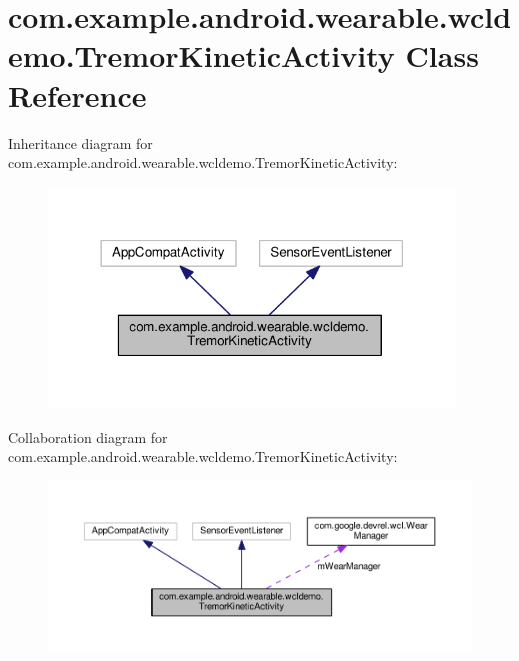 \hypertarget{classcom_1_1example_1_1android_1_1wearable_1_1wcldemo_1_1TremorKineticActivity}{}\section{com.\+example.\+android.\+wearable.\+wcldemo.\+Tremor\+Kinetic\+Activity Class Reference}
\label{classcom_1_1example_1_1android_1_1wearable_1_1wcldemo_1_1TremorKineticActivity}


Inheritance diagram for com.\+example.\+android.\+wearable.\+wcldemo.\+Tremor\+Kinetic\+Activity\+:
\nopagebreak
\begin{figure}[H]
\begin{center}
\leavevmode
\includegraphics[width=306pt]{de/da5/classcom_1_1example_1_1android_1_1wearable_1_1wcldemo_1_1TremorKineticActivity__inherit__graph}
\end{center}
\end{figure}


Collaboration diagram for com.\+example.\+android.\+wearable.\+wcldemo.\+Tremor\+Kinetic\+Activity\+:
\nopagebreak
\begin{figure}[H]
\begin{center}
\leavevmode
\includegraphics[width=350pt]{de/d41/classcom_1_1example_1_1android_1_1wearable_1_1wcldemo_1_1TremorKineticActivity__coll__graph}
\end{center}
\end{figure}
